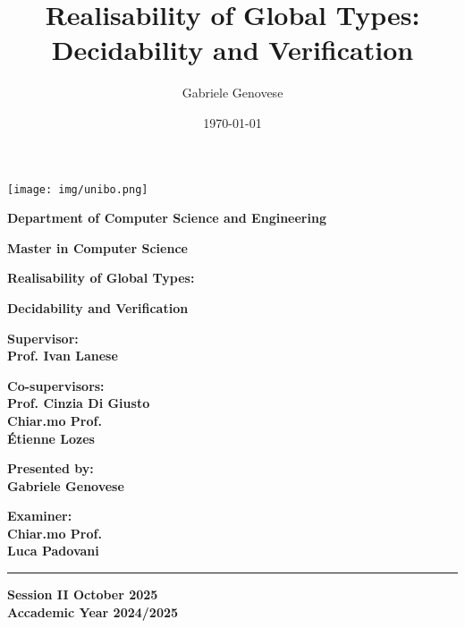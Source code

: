 \documentclass[12pt,a4paper,twoside]{book}
\title{Realisability of Global Types: Decidability and Verification}
\author{Gabriele Genovese}
\date{\today}
\theoremstyle{definition}
\theoremstyle{definition}
\theoremstyle{definition}
\begin{document}
\begin{titlepage}
\begin{center}
    \texttt{[image: img/unibo.png]}
    
    \vspace{10mm}
   
    {\large{\bf{Department of Computer Science and Engineering}}} 
    
    \vspace{5mm}

    {\Large{\bf{Master in Computer Science}}}
    
    \vspace{15mm}
    
    {\Huge{\bf Realisability of Global Types: }}\\
    
    \vspace{3mm}
    
    {\Huge{\bf Decidability and Verification }}\\
   
    \vspace{3mm}
\end{center}

\vspace{10mm}

\begin{minipage}[t]{0.45\textwidth}
    
    {\large{\bf Supervisor: \\ Prof. Ivan Lanese}}
    
    \vspace{3mm}
    
    {\large{\bf Co-supervisors:\\Prof. Cinzia Di Giusto\\Chiar.mo Prof.\\Étienne Lozes}}
\end{minipage}
\hfill
\begin{minipage}[t]{0.37\textwidth}\raggedleft
    {\large{\bf Presented by: \\ Gabriele Genovese}}\\
    
    \vspace{1mm}

    {\large{\bf Examiner: \\ \vspace{-2mm} Chiar.mo Prof. \\ Luca Padovani}}
\end{minipage}

\vspace{20mm}
\rule[0.5cm]{15cm}{0.6mm}

\begin{center}
    {\large{\bf Session II October 2025 \\}}
    {\large{\bf Accademic Year 2024/2025\\}}
\end{center}

\end{titlepage}
\end{document}
